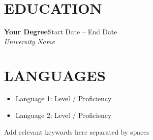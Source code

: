 \documentclass[11pt,a4paper]{article}
\newcommand{\eduentry}[4]{
  \noindent\textbf{#1}\hfill#2\\
  \textit{#3}\hfill\textit{#4}\\[0.5em]
}
\begin{document}
\section*{EDUCATION}
\eduentry{Your Degree}{Start Date -- End Date}
{University Name}{\href{https://university.edu}{}}

\section*{LANGUAGES}
\begin{itemize}
  \item Language 1: Level / Proficiency
  \item Language 2: Level / Proficiency
\end{itemize}

\vspace{1pt}
{\tiny\color{white}\setlength{\parindent}{0pt}\setlength{\parskip}{0pt}
Add relevant keywords here separated by spaces}
\end{document}

